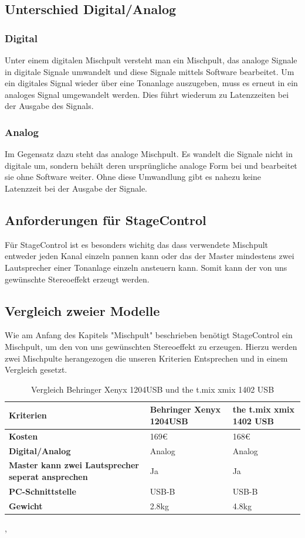 \subsection{Unterschied Digital/Analog}
\subsubsection{Digital}
Unter einem digitalen Mischpult versteht man ein Mischpult, das analoge Signale in digitale Signale umwandelt und diese Signale mittels Software bearbeitet. Um ein digitales Signal wieder über eine Tonanlage auszugeben, muss es erneut in ein analoges Signal umgewandelt werden. Dies führt wiederum zu Latenzzeiten bei der Ausgabe des Signals.
\subsubsection{Analog}
Im Gegensatz dazu steht das analoge Mischpult. Es wandelt die Signale nicht in digitale um, sondern behält deren ursprüngliche analoge Form bei und bearbeitet sie ohne Software weiter. Ohne diese Umwandlung gibt es nahezu keine Latenzzeit bei der Ausgabe der Signale. \\
\cite{Mischpult_Analog/Digital}

\subsection{Anforderungen für StageControl}
Für StageControl ist es besonders wichitg das dass verwendete Mischpult entweder jeden Kanal einzeln pannen kann oder das der Master mindestens zwei Lautsprecher einer Tonanlage einzeln ansteuern kann. Somit kann der von uns gewünschte Stereoeffekt erzeugt werden.

\subsection{Vergleich zweier Modelle}
Wie am Anfang des Kapitels "Mischpult" beschrieben benötigt StageControl ein Mischpult, um den von uns gewünschten Stereoeffekt zu erzeugen. Hierzu werden zwei Mischpulte herangezogen die unseren Kriterien Entsprechen und in einem Vergleich gesetzt.

\begin{table} [H]
	\begin{tabular}{ |p{3.1cm} |p{4.8cm}|p{4.8cm}| }
		\hline
		\textbf{Kriterien} & \textbf{Behringer Xenyx 1204USB}& \textbf{the t.mix xmix 1402 USB}\\
		\hline
		\textbf{Kosten} & 169€ & 168€  \\ 
		\hline
		\textbf{Digital/Analog} & Analog & Analog   \\  
		\hline
		\textbf{Master kann zwei Lautsprecher seperat ansprechen} & Ja & Ja \\
		\hline
		\textbf{PC-Schnittstelle} & USB-B & USB-B  \\
		\hline
		\textbf{Gewicht}& 2.8kg & 4.8kg \\
		\hline	
	\end{tabular}
	\caption{Vergleich Behringer Xenyx 1204USB und the t.mix xmix 1402 USB} 
\end{table} 
\cite{Mischpult_Kriterien_1204}, \cite{Mischpult_Kriterien_1402}

